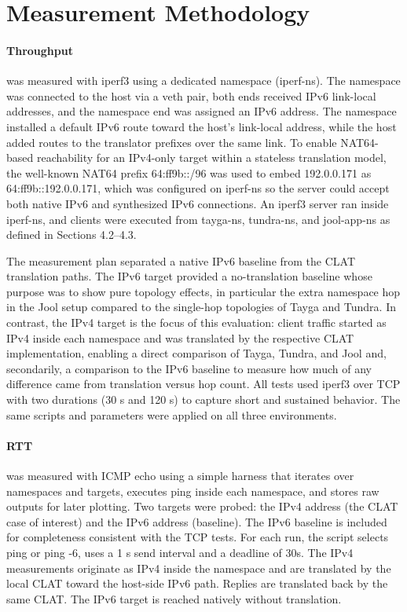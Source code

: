 \section{Measurement Methodology}
\paragraph{Throughput} was measured with iperf3 using a dedicated namespace (iperf-ns). The namespace was connected to the host via a veth pair, both ends received IPv6 link-local addresses, and the namespace end was assigned an IPv6 address. The namespace installed a default IPv6 route toward the host’s link-local address, while the host added routes to the translator prefixes over the same link. To enable NAT64-based reachability for an IPv4-only target within a stateless translation model, the well-known NAT64 prefix 64:ff9b::/96 was used to embed 192.0.0.171 as 64:ff9b::192.0.0.171, which was configured on iperf-ns so the server could accept both native IPv6 and synthesized IPv6 connections\cite{rfc7915}. An iperf3 server ran inside iperf-ns, and clients were executed from tayga-ns, tundra-ns, and jool-app-ns as defined in Sections 4.2–4.3.

The measurement plan separated a native IPv6 baseline from the CLAT translation paths. The IPv6 target provided a no-translation baseline whose purpose was to show pure topology effects, in particular the extra namespace hop in the Jool setup compared to the single-hop topologies of Tayga and Tundra. In contrast, the IPv4 target is the focus of this evaluation: client traffic started as IPv4 inside each namespace and was translated by the respective CLAT implementation, enabling a direct comparison of Tayga, Tundra, and Jool and, secondarily, a comparison to the IPv6 baseline to measure how much of any difference came from translation versus hop count. All tests used iperf3 over TCP with two durations (30 s and 120 s) to capture short and sustained behavior. The same scripts and parameters were applied on all three environments. 

\paragraph{RTT} was measured with ICMP echo using a simple harness that iterates over namespaces and targets, executes ping inside each namespace, and stores raw outputs for later plotting. Two targets were probed: the IPv4 address (the CLAT case of interest) and the IPv6 address (baseline). The IPv6 baseline is included for completeness consistent with the TCP tests.
For each run, the script selects ping or ping -6, uses a 1 s send interval and a deadline of 30s. The IPv4 measurements originate as IPv4 inside the namespace and are translated by the local CLAT toward the host-side IPv6 path. Replies are translated back by the same CLAT. The IPv6 target is reached natively without translation. 
